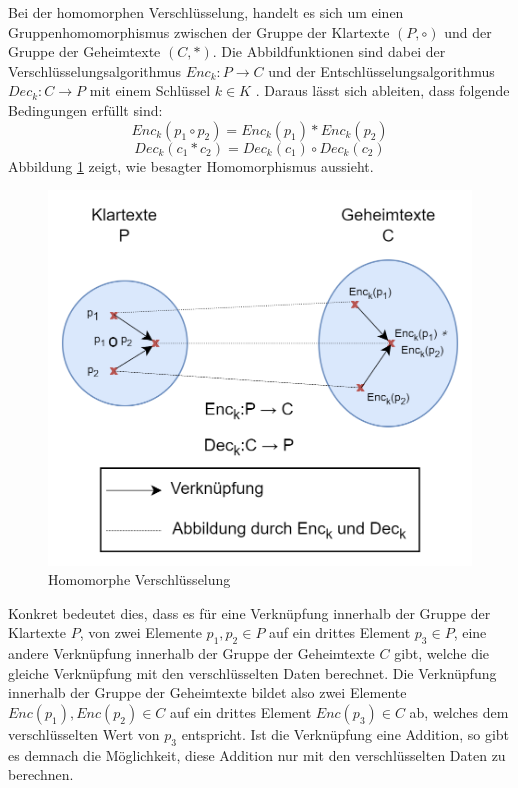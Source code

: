 Bei der homomorphen Verschlüsselung, handelt es sich um einen Gruppenhomomorphismus zwischen der Gruppe der Klartexte $(P,\circ)$ und der Gruppe der Geheimtexte $(C,\ast)$. 
Die Abbildfunktionen sind dabei der Verschlüsselungsalgorithmus $Enc_k:P\to C$ und der Entschlüsselungsalgorithmus $Dec_k:C\to P$ mit einem Schlüssel $k \in K$ \cite{P-98}. 
Daraus lässt sich ableiten, dass folgende Bedingungen erfüllt sind:
\begin{equation*}
    Enc_k(p_1 \circ p_2) = Enc_k(p_1) \ast Enc_k(p_2) 
\end{equation*}
\begin{equation*}
Dec_k(c_1 \ast c_2) = Dec_k(c_1) \circ Dec_k(c_2)
\end{equation*}
Abbildung \ref{fig:homo_enc} zeigt, wie besagter Homomorphismus aussieht.


\begin{figure}[!htb]
    \centering
    \includegraphics[width=12.5cm]{figures/homo_enc.png}
    \caption{Homomorphe Verschlüsselung}
    \label{fig:homo_enc}
\end{figure} 

Konkret bedeutet dies, dass es für eine Verknüpfung innerhalb der Gruppe der Klartexte $P$, von zwei Elemente $p_1, p_2 \in P$ auf ein drittes Element $p_3 \in P$, eine andere Verknüpfung innerhalb der Gruppe der Geheimtexte $C$ gibt, welche die gleiche Verknüpfung mit den verschlüsselten Daten berechnet. Die Verknüpfung innerhalb der Gruppe der Geheimtexte bildet also zwei Elemente $Enc(p_1), Enc(p_2) \in C$ auf ein drittes Element $Enc(p_3) \in C$ ab, welches dem verschlüsselten Wert von $p_3$ entspricht.
Ist die Verknüpfung eine Addition, so gibt es demnach die Möglichkeit, diese Addition nur mit den verschlüsselten Daten zu berechnen.

